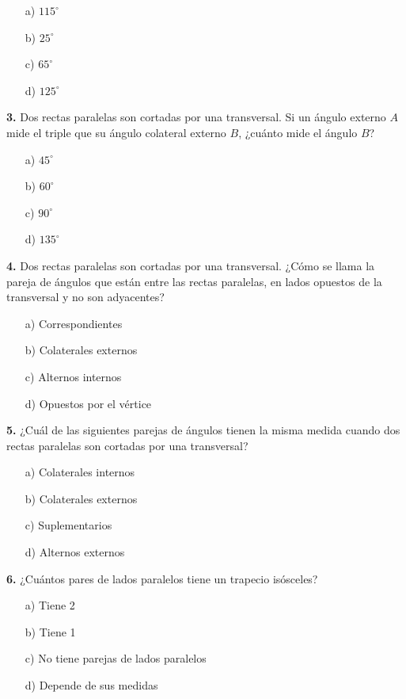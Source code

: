 \begin{itemize}
    \item[a)] $115^\circ$
    \item[b)] $25^\circ$
    \item[c)] $65^\circ$
    \item[d)] $125^\circ$
\end{itemize}


\noindent\textbf{3.} Dos rectas paralelas son cortadas por una transversal. Si un ángulo externo $A$ mide el triple que su ángulo colateral externo $B$, ¿cuánto mide el ángulo $B$?

\begin{itemize}
    \item[a)] $45^\circ$
    \item[b)] $60^\circ$
    \item[c)] $90^\circ$
    \item[d)] $135^\circ$
\end{itemize}


\noindent\textbf{4.} Dos rectas paralelas son cortadas por una transversal. ¿Cómo se llama la pareja de ángulos que están entre las rectas paralelas, en lados opuestos de la transversal y no son adyacentes?

\begin{itemize}
    \item[a)] Correspondientes
    \item[b)] Colaterales externos
    \item[c)] Alternos internos
    \item[d)] Opuestos por el vértice
\end{itemize}


\noindent\textbf{5.} ¿Cuál de las siguientes parejas de ángulos tienen la misma medida cuando dos rectas paralelas son cortadas por una transversal?

\begin{itemize}
    \item[a)] Colaterales internos
    \item[b)] Colaterales externos
    \item[c)] Suplementarios
    \item[d)] Alternos externos
\end{itemize}


\noindent\textbf{6.} ¿Cuántos pares de lados paralelos tiene un trapecio isósceles?

\begin{itemize}
    \item[a)] Tiene 2
    \item[b)] Tiene 1
    \item[c)] No tiene parejas de lados paralelos
    \item[d)] Depende de sus medidas
\end{itemize}


